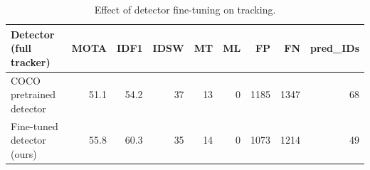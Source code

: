 \begin{table}[h]
\caption{Effect of detector fine-tuning on tracking.}
\label{tab:detector_tracking}
\begin{tabular}{lrrrrrrrr}
\toprule
Detector (full tracker) & MOTA & IDF1 & IDSW & MT & ML & FP & FN & pred_IDs \\
\midrule
COCO pretrained detector & 51.1 & 54.2 & 37 & 13 & 0 & 1185 & 1347 & 68 \\
Fine-tuned detector (ours) & 55.8 & 60.3 & 35 & 14 & 0 & 1073 & 1214 & 49 \\
\bottomrule
\end{tabular}
\end{table}
